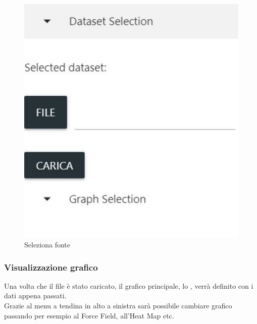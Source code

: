 \documentclass[../manuale_utente.tex]{subfiles}
\begin{document}
\begin{figure}[H]
	\centering
	\includegraphics[width=18cm]{img/seleziona_dataset.jpg}
	\caption{Seleziona fonte}
\end{figure}

\subsubsection{Visualizzazione grafico}
    \label{subsub:vis_graf}
Una volta che il file è stato caricato, il grafico principale, lo , verrà definito con i dati appena passati. \\
Grazie al menu a tendina in alto a sinistra sarà possibile cambiare grafico passando per esempio al Force Field, all’Heat Map etc.
\end{document}
